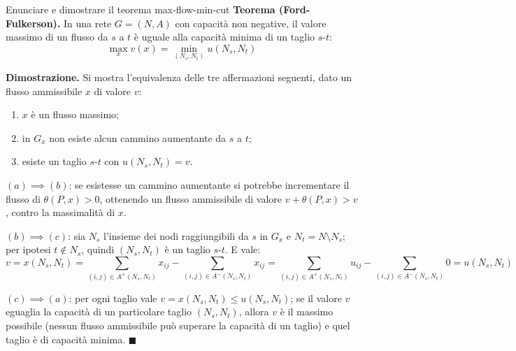 \documentclass[12pt]{extarticle} %
\begin{document}

\begin{teoriabox}{Enunciare e dimostrare il teorema max-flow-min-cut}
\textbf{Teorema (Ford-Fulkerson).} In una rete $G=(N,A)$ con capacità non negative, il valore massimo di un flusso da $s$ a $t$ è uguale alla capacità minima di un taglio $s$-$t$: %
\[
\max_x v(x) = \min_{(N_s,N_t)} u(N_s,N_t)
\] %

\noindent\textbf{Dimostrazione.} Si mostra l'equivalenza delle tre affermazioni seguenti, dato un flusso ammissibile $x$ di valore $v$: %
\begin{enumerate}
    \item[(a)] $x$ è un flusso massimo; %
    \item[(b)] in $G_x$ non esiste alcun cammino aumentante da $s$ a $t$; %
    \item[(c)] esiste un taglio $s$-$t$ con $u(N_s,N_t) = v$. %
\end{enumerate}

\noindent $(a) \implies (b)$: se esistesse un cammino aumentante si potrebbe incrementare il flusso di $\theta(P,x) > 0$, ottenendo un flusso ammissibile di valore $v + \theta(P,x) > v$, contro la massimalità di $x$. %

\noindent $(b) \implies (c)$: sia $N_s$ l'insieme dei nodi raggiungibili da $s$ in $G_x$ e $N_t = N\setminus N_s$; per ipotesi $t \notin N_s$, quindi $(N_s,N_t)$ è un taglio $s$-$t$.
E vale:
\[
v = x(N_s,N_t) = \sum_{(i,j)\in A^+(N_s,N_t)} x_{ij} - \sum_{(i,j)\in A^-(N_s,N_t)} x_{ij} = \sum_{(i,j)\in A^+(N_s,N_t)} u_{ij} - \sum_{(i,j)\in A^-(N_s,N_t)} 0 = u(N_s,N_t)
\] %

\noindent $(c) \implies (a)$: per ogni taglio vale $v = x(N_s, N_t) \le u(N_s,N_t)$; se il valore $v$ eguaglia la capacità di un particolare taglio $(N_s,N_t)$, allora $v$ è il massimo possibile (nessun flusso ammissibile può superare la capacità di un taglio) e quel taglio è di capacità minima. $\blacksquare$ %

\end{teoriabox}

\end{document}
